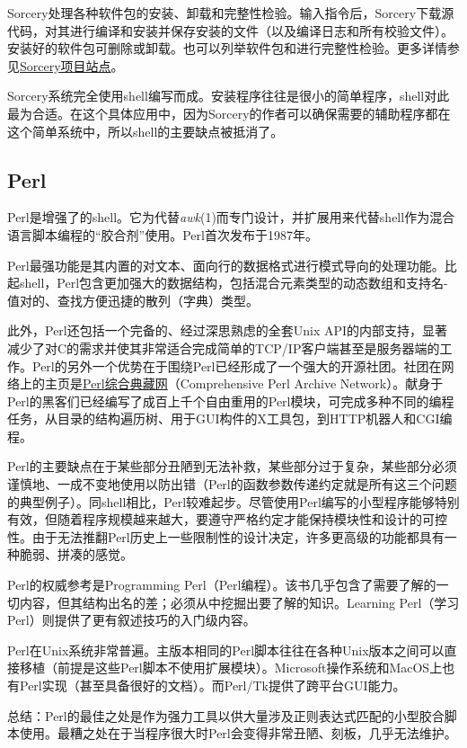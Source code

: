 \documentclass[12pt,oneside]{book}
\begin{document}
\begin{common-format}
Sorcery处理各种软件包的安装、卸载和完整性检验。输入指令后，Sorcery下载源代码，对其进行编译和安装并保存安装的文件（以及编译日志和所有校验文件）。安装好的软件包可删除或卸载。也可以列举软件包和进行完整性检验。更多详情参见\href{http://sorcerer.wox.org/}{Sorcery项目站点}。

Sorcery系统完全使用shell编写而成。安装程序往往是很小的简单程序，shell对此最为合适。在这个具体应用中，因为Sorcery的作者可以确保需要的辅助程序都在这个简单系统中，所以shell的主要缺点被抵消了。


\subsection{Perl}
Perl是增强了的shell。它为代替\textit{awk}(1)而专门设计，并扩展用来代替shell作为混合语言脚本编程的“胶合剂”使用。Perl首次发布于1987年。

Perl最强功能是其内置的对文本、面向行的数据格式进行模式导向的处理功能。比起shell，Perl包含更加强大的数据结构，包括混合元素类型的动态数组和支持名-值对的、查找方便迅捷的散列（字典）类型。

此外，Perl还包括一个完备的、经过深思熟虑的全套Unix API的内部支持，显著减少了对C的需求并使其非常适合完成简单的TCP/IP客户端甚至是服务器端的工作。Perl的另外一个优势在于围绕Perl已经形成了一个强大的开源社团。社团在网络上的主页是\href{http://www.cpan.org/}{Perl综合典藏网}（Comprehensive Perl Archive Network）。献身于Perl的黑客们已经编写了成百上千个自由重用的Perl模块，可完成多种不同的编程任务，从目录的结构遍历树、用于GUI构件的X工具包，到HTTP机器人和CGI编程。

Perl的主要缺点在于某些部分丑陋到无法补救，某些部分过于复杂，某些部分必须谨慎地、一成不变地使用以防出错（Perl的函数参数传递约定就是所有这三个问题的典型例子）。同shell相比，Perl较难起步。尽管使用Perl编写的小型程序能够特别有效，但随着程序规模越来越大，要遵守严格约定才能保持模块性和设计的可控性。由于无法推翻Perl历史上一些限制性的设计决定，许多更高级的功能都具有一种脆弱、拼凑的感觉。

Perl的权威参考是Programming Perl（Perl编程）\cite{Wall2000}。该书几乎包含了需要了解的一切内容，但其结构出名的差；必须从中挖掘出要了解的知识。Learning Perl（学习Perl）\cite{Schwartz-Christiansen}则提供了更有叙述技巧的入门级内容。

Perl在Unix系统非常普遍。主版本相同的Perl脚本往往在各种Unix版本之间可以直接移植（前提是这些Perl脚本不使用扩展模块）。Microsoft操作系统和MacOS上也有Perl实现（甚至具备很好的文档）。而Perl/Tk提供了跨平台GUI能力。

总结：Perl的最佳之处是作为强力工具以供大量涉及正则表达式匹配的小型胶合脚本使用。最糟之处在于当程序很大时Perl会变得非常丑陋、刻板，几乎无法维护。


\end{common-format}
\end{document}
